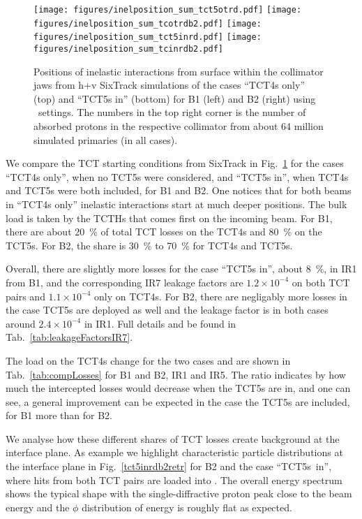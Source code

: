\begin{figure}%
\begin{center}
\texttt{[image: figures/inelposition\_sum\_tct5otrd.pdf]}
\texttt{[image: figures/inelposition\_sum\_tcotrdb2.pdf]}
\texttt{[image: figures/inelposition\_sum\_tct5inrd.pdf]}
\texttt{[image: figures/inelposition\_sum\_tcinrdb2.pdf]}
\end{center}
\vspace{-0.6cm}
 \caption{Positions of inelastic interactions from surface within the collimator jaws from h+v SixTrack simulations of the cases ``TCT4s only'' (top) and ``TCT5s in'' (bottom) for B1 (left) and B2 (right) using \twosigmaret~settings. The numbers in the top right corner is the number of absorbed protons in the respective collimator from about 64 million simulated primaries (in all cases).
  \label{inelHLtctsInOut}}
\end{figure}

We compare the TCT starting conditions from SixTrack in Fig.~\ref{inelHLtctsInOut} for the cases ``TCT4s only'', when no TCT5s were considered, and ``TCT5s in'', when TCT4s and TCT5s were both included, for B1 and B2. One notices that for both beams in ``TCT4s only'' inelastic interactions start at much deeper positions. The bulk load is taken by the TCTHs that comes first on the incoming beam. For B1, there are about 20~\% of total TCT losses on the TCT4s and 80~\% on the TCT5s. For B2, the share is 30~\% to 70~\% for TCT4s and TCT5s.

Overall, there are slightly more losses for the case ``TCT5s in'', about 8~\%, in IR1 from B1, and the corresponding IR7 leakage factors are $1.2 \times 10^{-4}$ on both TCT pairs and $1.1 \times 10^{-4}$ only on TCT4s. For B2, there are negligably more losses in the case TCT5s are deployed as well and the leakage factor is in both cases around $2.4 \times 10^{-4}$ in IR1. Full details and be found in Tab.~\ref{tab:leakageFactorsIR7}.

The load on the TCT4s change for the two cases and are shown in Tab.~\ref{tab:compLosses} for B1 and B2, IR1 and IR5. The ratio indicates by how much the intercepted losses would decrease when the TCT5s are in, and one can see, a general improvement can be expected in the case the TCT5s are included, for B1 more than for B2.

We analyse how these different shares of TCT losses create background at the interface plane. As example we highlight characteristic particle distributions at the interface plane in Fig.~\ref{tct5inrdb2retr} for B2 and the case ``TCT5s~in'', where hits from both TCT pairs are loaded into \fluka. The overall energy spectrum shows the typical shape with the single-diffractive proton peak close to the beam energy and the $\phi$ distribution of energy is roughly flat as expected.

